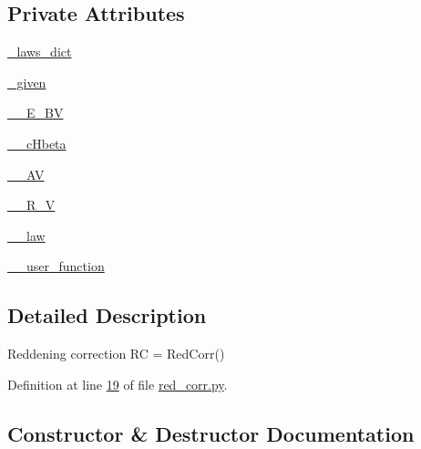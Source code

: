 \subsection*{Private Attributes}
\begin{DoxyCompactItemize}
\item 
\hyperlink{classpyneb_1_1extinction_1_1red__corr_1_1_red_corr_a96fbed6f54a26dd2f59fe6441c9c3865}{\+\_\+laws\+\_\+dict}
\item 
\hyperlink{classpyneb_1_1extinction_1_1red__corr_1_1_red_corr_a99ab4dcd33d50360f4fb61bc80fc90d5}{\+\_\+given}
\item 
\hyperlink{classpyneb_1_1extinction_1_1red__corr_1_1_red_corr_ad223ec4556fb47fc607488c318e58b13}{\+\_\+\+\_\+\+E\+\_\+\+B\+V}
\item 
\hyperlink{classpyneb_1_1extinction_1_1red__corr_1_1_red_corr_ab91dff40a007dd632c35d98042077f3d}{\+\_\+\+\_\+c\+Hbeta}
\item 
\hyperlink{classpyneb_1_1extinction_1_1red__corr_1_1_red_corr_a476840870719872a12ab48a0d1f1a839}{\+\_\+\+\_\+\+A\+V}
\item 
\hyperlink{classpyneb_1_1extinction_1_1red__corr_1_1_red_corr_a93f7e44201375bc6e05a20c092b6a1d6}{\+\_\+\+\_\+\+R\+\_\+\+V}
\item 
\hyperlink{classpyneb_1_1extinction_1_1red__corr_1_1_red_corr_a08b0e3499e1b8a289d7b2c7e805e6129}{\+\_\+\+\_\+law}
\item 
\hyperlink{classpyneb_1_1extinction_1_1red__corr_1_1_red_corr_aaf6e0eb6732be82bc65b02c36a2429c2}{\+\_\+\+\_\+user\+\_\+function}
\end{DoxyCompactItemize}


\subsection{Detailed Description}
\begin{DoxyVerb}Reddening correction
RC = RedCorr()\end{DoxyVerb}
 

Definition at line \hyperlink{red__corr_8py_source_l00019}{19} of file \hyperlink{red__corr_8py_source}{red\+\_\+corr.\+py}.



\subsection{Constructor \& Destructor Documentation}
\hypertarget{classpyneb_1_1extinction_1_1red__corr_1_1_red_corr_a27b836e3bd87558f6156a8bf94fbf658}{}
